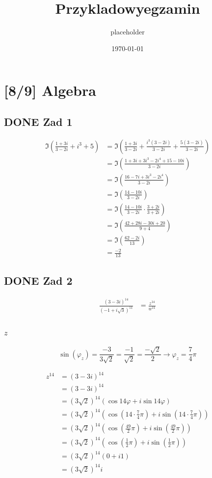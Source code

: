 \documentclass[11pt]{article}
\author{placeholder}
\date{\today}
\title{Przykladowyegzamin}
\begin{document}
\maketitle
\tableofcontents

\section{[8/9] Algebra}
\label{sec:org42fcfa8}
\subsection{{\bfseries\sffamily DONE} Zad 1}
\label{sec:org26447e6}
\begin{align*}
\Im \left(\frac{1+3i}{3-2i} + i^{3} + 5\right)
 &=\Im \left(\frac{1+3i}{3-2i} + \frac{i^{3}(3-2i)}{3-2i} + \frac{5(3-2i)}{3-2i}\right)\\
 &= \Im \left(\frac{1+3i + 3i^3 - 2 i^4 + 15 - 10i}{3-2i}\right)\\
 &= \Im \left(\frac{16 - 7i + 3i^{3} -2i^{4}}{3-2i}\right)\\
 &= \Im \left(\frac{14 - 10i}{3-2i}\right)\\
 &= \Im \left(\frac{14 - 10i}{3-2i} \cdot \frac{3+2i}{3+2i}\right)\\
 &= \Im \left(\frac{42 + 28i - 30i + 20}{9 + 4}\right)\\
 &= \Im \left(\frac{62 - 2i }{13}\right)\\
 &= \frac{-2}{13}
\end{align*}
\subsection{{\bfseries\sffamily DONE} Zad 2}
\label{sec:orgc37dc43}
\begin{align*}
  \frac{ { (3 - 3i)}^{14} }
  { { (-1+i\sqrt{3}) }^{11} }
  &= \frac{z^{14}}{w^{11}}
\end{align*}
\subsubsection{\(z\)}
\label{sec:org9c57428}
$$\sin(\varphi_z) = \frac{-3}{3\sqrt{2}}
 = \frac{-1}{\sqrt{2}}
 = \frac{-\sqrt{2}}{2} \to \varphi_z = \frac{7}{4}\pi$$

\begin{align*}
  z^{14} &= {(3 - 3i)}^{14}\\
  &= {(3-3i)}^{14}\\
  &= {(3\sqrt{2})}^{14}(\cos 14 \varphi + i \sin 14 \varphi)\\
  &= {(3\sqrt{2})}^{14} \left(\cos \left(14 \cdot \frac{7}{4} \pi \right) + i \sin \left(14 \cdot \frac{7}{4} \pi \right) \right)\\
  &= {(3\sqrt{2})}^{14} \left( \cos \left ( \frac{49}{2} \pi \right) + i \sin \left(\frac{49}{2} \pi \right) \right)\\
  &= {(3\sqrt{2})}^{14} \left( \cos \left ( \frac{1}{2} \pi \right) + i \sin \left(\frac{1}{2} \pi \right) \right)\\
  &= {(3\sqrt{2})}^{14} ( 0 + i 1 )\\
  &= {(3\sqrt{2})}^{14}i
\end{align*}
\end{document}
